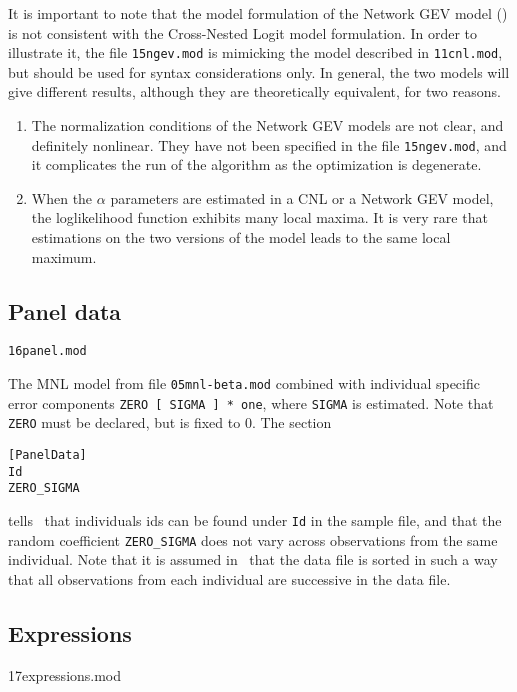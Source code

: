 \documentclass[12pt]{memoir}
\begin{document}
It is important to note that the model formulation of the Network GEV
model (\cite{DalyBier06}) is not consistent with the Cross-Nested
Logit model formulation. In order to illustrate it, the file
\verb+15ngev.mod+ is mimicking the model described in
\verb+11cnl.mod+, but should be used for syntax considerations only.
In general, the two models will give different results, although they
are theoretically equivalent, for two reasons.

\begin{enumerate}
\item The normalization conditions of the Network GEV models are not
  clear, and definitely nonlinear. They have not been specified in the
  file \verb+15ngev.mod+, and it complicates the run of the algorithm
  as the optimization is degenerate.
\item When the $\alpha$ parameters are estimated in a CNL or a Network
  GEV model, the loglikelihood function exhibits many local maxima. It
  is very rare that estimations on the two versions of the model leads
  to the same local maximum.
\end{enumerate}

\subsection{Panel data}
\label{sec:panel_ex}
\begin{flushright}
\verb+16panel.mod+
\end{flushright}
The MNL model from file \verb+05mnl-beta.mod+ combined with individual
specific error components \verb+ZERO [ SIGMA ] * one+, where \verb+SIGMA+
is estimated. Note that \verb+ZERO+ must be declared, but is
fixed to 0. 
The section
{\footnotesize
\begin{verbatim}
[PanelData]
Id
ZERO_SIGMA
\end{verbatim}
}
tells \BIOGEME\ that individuals ids can be found under \verb+Id+ in
the sample file, and that the random coefficient  \verb+ZERO_SIGMA+
does not vary across observations from the same individual. Note that
it is assumed in \BIOGEME\ that the data file is sorted in such a way
that all observations from each individual are successive in the data file.

\subsection{Expressions}

\begin{flushright}
 17expressions.mod
\end{flushright}
\end{document}

